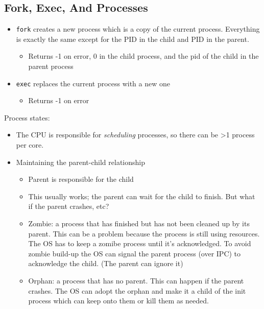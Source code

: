 \documentclass[../notes.tex]{subfiles}
\begin{document}
\subsection{Fork, Exec, And Processes}

\begin{itemize}
    \item \texttt{fork} creates a new process which is a copy of the current process. Everything is exactly the same except for the PID in the child and PID in the parent.
        \begin{itemize}
            \item Returns -1 on error, 0 in the child process, and the pid of the child in the parent process
        \end{itemize}
    \item \texttt{exec} replaces the current process with a new one
        \begin{itemize}
            \item Returns -1 on error
        \end{itemize}


\end{itemize}

Process states:

\begin{itemize}
    \item The CPU is responsible for \textit{scheduling} processes, so there can be >1 process per core.
    \item Maintaining the parent-child relationship
        \begin{itemize}
            \item Parent is responsible for the child 
            \item This usually works; the parent can wait for the child to finish. But what if the parent crashes, etc?
            \item Zombie: a process that has finished but has not been cleaned up by its parent. This can be a problem because the process is still using resources. The OS has to keep a zomibe process until it's acknowledged. To avoid zombie build-up the OS can signal the parent process (over IPC) to acknowledge the child. (The parent can ignore it)
            \item Orphan: a process that has no parent. This can happen if the parent crashes. The OS can adopt the orphan and make it a child of the init process which can keep onto them or kill them as needed.
        \end{itemize}
\end{itemize}
\end{document}
